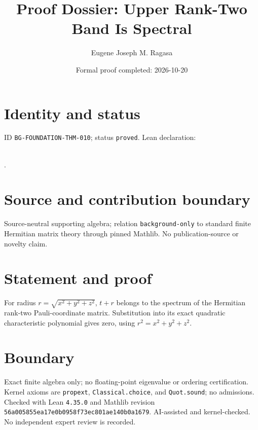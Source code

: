 \documentclass[11pt]{article}
\title{Proof Dossier: Upper Rank-Two Band Is Spectral}\author{Eugene Joseph M. Ragasa}\date{Formal proof completed: 2026-10-20}
\begin{document}
\maketitle
\section{Identity and status}
ID \texttt{BG-FOUNDATION-THM-010}; status \texttt{proved}. Lean declaration:
\par{}\\
{\tiny{}}.
\section{Source and contribution boundary}
Source-neutral supporting algebra; relation \texttt{background-only} to standard finite
Hermitian matrix theory through pinned Mathlib. No publication-source or novelty claim.
\section{Statement and proof}
For radius $r=\sqrt{x^2+y^2+z^2}$, $t+r$ belongs to the spectrum of the Hermitian
rank-two Pauli-coordinate matrix. Substitution into its exact quadratic characteristic
polynomial gives zero, using $r^2=x^2+y^2+z^2$.
\section{Boundary}
Exact finite algebra only; no floating-point eigenvalue or ordering certification.
Kernel axioms are \texttt{propext}, \texttt{Classical.choice}, and \texttt{Quot.sound}; no admissions. Checked with Lean \texttt{4.35.0} and Mathlib revision \texttt{56a005855ea17e0b0958f73ec801ae140b0a1679}. AI-assisted and kernel-checked. No independent expert review is recorded.
\end{document}

